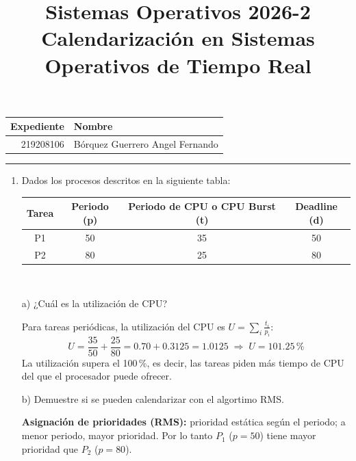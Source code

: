 \documentclass[a4paper, 11pt]{article}
\title
{
    Sistemas Operativos 2026-2 \\
    Calendarización en Sistemas Operativos de Tiempo Real
}
\newcommand{\Aspace}{0.2cm}
\begin{document}
\maketitle

\begin{center}
    \begin{tabular}{r|l}
        \textbf{Expediente} & \textbf{Nombre} \\ \hline
        219208106 & Bórquez Guerrero Angel Fernando \\
    \end{tabular}
\end{center}

\rule{\linewidth}{0.3mm}

\vspace{0.3cm}
\begin{enumerate}
    \item Dados los procesos descritos en la siguiente tabla: \par
    \begin{tabular}{|c|c|c|c|}
        \hline
        \textbf{Tarea} & \textbf{Periodo (p)} & \textbf{Periodo de CPU o CPU Burst (t)} & \textbf{Deadline (d)} \\
        \hline
        P1 & 50 & 35 & 50 \\
        \hline
        P2 & 80 & 25 & 80 \\
        \hline
    \end{tabular} \\
        \vspace{\Aspace} \par
        a) ¿Cuál es la utilización de CPU?
        \par { \color{azul} 
        Para tareas periódicas, la utilización del CPU es $U=\sum_i \frac{t_i}{p_i}$:
        \[
            U = \frac{35}{50} + \frac{25}{80} = 0.70 + 0.3125 = 1.0125 \;\Rightarrow\; U = 101.25\,\%
        \]
        La utilización supera el 100\,\%, es decir, las tareas piden más tiempo de CPU del que el procesador puede ofrecer.
        }

        \vspace{\Aspace} \par
        b) Demuestre si se pueden calendarizar con el algortimo RMS.
        \par { \color{azul} 
        \textbf{Asignación de prioridades (RMS):} prioridad estática según el periodo; a menor periodo, mayor prioridad. Por lo tanto $P_1$ ($p=50$) tiene mayor prioridad que $P_2$ ($p=80$).

}
\end{enumerate}
\end{document}
